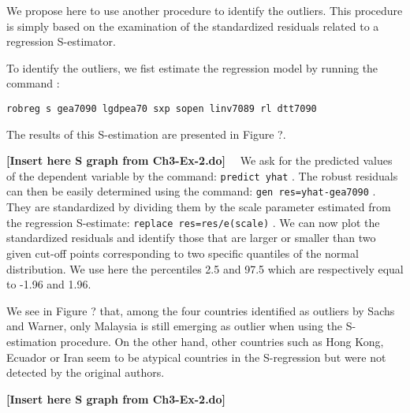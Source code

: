 We propose here to use another procedure to identify the outliers. This
procedure is simply based on the examination of the standardized residuals
related to a regression S-estimator.

To identify the outliers, we fist estimate the regression model by running the
command :%

\texttt{robreg s gea7090 lgdpea70 sxp sopen linv7089 rl dtt7090}%


The results of this S-estimation are presented in Figure ?.%

\textbf{[Insert here S graph from Ch3-Ex-2.do]} \ \newline\ We ask for
the predicted values of the dependent variable by the command:
\texttt{predict yhat}%
. The robust residuals can then be easily determined using the command:
\texttt{gen res=yhat-gea7090}%
. They are standardized by dividing them by the scale parameter estimated from
the regression S-estimate:%
\texttt{replace res=res/e(scale)}%
. We can now plot the standardized residuals and identify those that are
larger or smaller than two given cut-off points corresponding to two specific
quantiles of the normal distribution. We use here the percentiles 2.5 and 97.5
which are respectively equal to -1.96 and 1.96.

We see in Figure ?%
that, among the four
countries identified as outliers by Sachs and Warner, only Malaysia is still
emerging as outlier when using the S-estimation procedure. On the other hand,
other countries such as Hong Kong, Ecuador or Iran seem to be atypical
countries in the S-regression but were not detected by the original authors.



\textbf{[Insert here S graph from Ch3-Ex-2.do]} \ \newline

